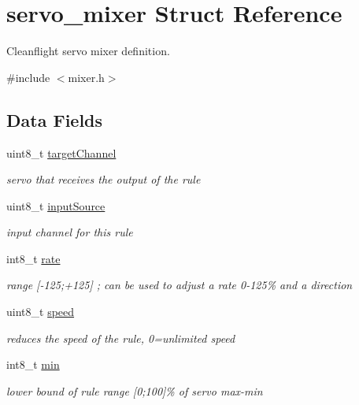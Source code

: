 \hypertarget{structservo__mixer}{\section{servo\+\_\+mixer Struct Reference}
\label{structservo__mixer}
}


Cleanflight servo mixer definition.  




{\ttfamily \#include $<$mixer.\+h$>$}

\subsection*{Data Fields}
\begin{DoxyCompactItemize}
\item 
uint8\+\_\+t \hyperlink{structservo__mixer_a67dc3ae6d3ebe59806a87c413cfb9f2b}{target\+Channel}
\begin{DoxyCompactList}\small\item\em servo that receives the output of the rule \end{DoxyCompactList}\item 
uint8\+\_\+t \hyperlink{structservo__mixer_a40f47a678b24b3a2e045f7a3cbd5d7a0}{input\+Source}
\begin{DoxyCompactList}\small\item\em input channel for this rule \end{DoxyCompactList}\item 
int8\+\_\+t \hyperlink{structservo__mixer_adb092f1954c0c41ea3da120b9888e824}{rate}
\begin{DoxyCompactList}\small\item\em range \mbox{[}-\/125;+125\mbox{]} ; can be used to adjust a rate 0-\/125\% and a direction \end{DoxyCompactList}\item 
uint8\+\_\+t \hyperlink{structservo__mixer_a8f7ee6886f8316ddecbfe76a7a64e586}{speed}
\begin{DoxyCompactList}\small\item\em reduces the speed of the rule, 0=unlimited speed \end{DoxyCompactList}\item 
int8\+\_\+t \hyperlink{structservo__mixer_a20a1254955434895a2f7b7145b3f8c3d}{min}
\begin{DoxyCompactList}\small\item\em lower bound of rule range \mbox{[}0;100\mbox{]}\% of servo max-\/min \end{DoxyCompactList}\item 

\end{DoxyCompactItemize}
